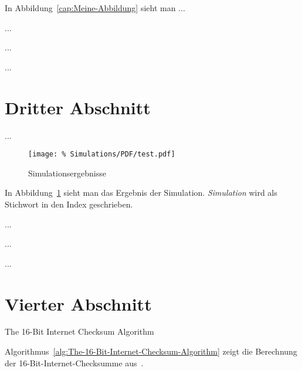 In Abbildung~\ref{cap:Meine-Abbildung} sieht man ...

...

...

...



\section{Dritter Abschnitt}
\label{sec:Abschnitt3}

...

\begin{figure}
\begin{center}
\texttt{[image: \%
   Simulations/PDF/test.pdf]}
\end{center}
\caption{Simulationsergebnisse}
\label{cap:Simulationsergebnisse}
\end{figure}

In Abbildung~\ref{cap:Simulationsergebnisse} sieht man das
Ergebnis der Simulation. \emph{Simulation} wird
als Stichwort in den Index geschrieben.

...

...

...



\section{Vierter Abschnitt}
\label{sec:Abschnitt4}

\begin{algorithm}

\caption{The 16-Bit Internet Checksum Algorithm}
\label{alg:The-16-Bit-Internet-Checksum-Algorithm}
\end{algorithm}

Algorithmus~\ref{alg:The-16-Bit-Internet-Checksum-Algorithm} zeigt die
Berechnung der 16-Bit-Internet-Checksumme aus~\cite{RFC1071,RFC1624}.



